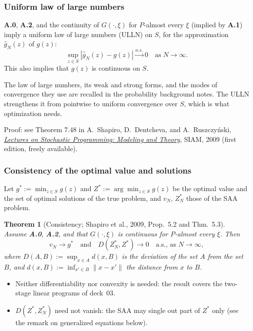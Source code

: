 \documentclass[aspectratio=169]{beamer}
\newtheorem{theo}{Theorem}
\begin{document}
\begin{frame}
\frametitle{Uniform law of large numbers}

\textbf{A.0}, \textbf{A.2}, and the continuity of $G(\cdot,\xi)$ for $P$-almost every $\xi$ (implied by \textbf{A.1}) imply a {\blue uniform law of large numbers (ULLN)} on $S$, for the approximation $\hat{g}_N(z)$ of $g(z)$:%
\[
\sup_{z \in S} \left| \hat{g}_N(z) - g(z) \right|
\overset{a.s.}{\longrightarrow} 0
\quad \mbox{as} \; N \rightarrow \infty.
\]
This also implies that $g(z)$ is continuous on $S$.

\mbox{}

\begin{footnotesize}
The law of large numbers, its weak and strong forms, and the modes of convergence they use are recalled in the {\red probability background notes}. The ULLN strengthens it from pointwise to uniform convergence over $S$, which is what optimization needs.
\end{footnotesize}

\mbox{}

Proof: see Theorem 7.48 in A.~Shapiro, D.~Dentcheva, and A.~Ruszczy\'nski, \href{https://bpb-us-e1.wpmucdn.com/sites.gatech.edu/dist/4/1470/files/2021/03/SPbook.pdf}{\sl Lectures on Stochastic Programming: Modeling and Theory}, SIAM, 2009 (first edition, freely available).

\end{frame}

\begin{frame}
\frametitle{Consistency of the optimal value and solutions}

Let $g^* := \min_{z \in S} g(z)$ and $Z^* := \arg\min_{z \in S} g(z)$ be the optimal value and the set of optimal solutions of the true problem, and $v_N$, $Z^*_N$ those of the SAA problem.

\begin{theo}[Consistency; Shapiro et al., 2009, Prop.~5.2 and Thm.~5.3]
Assume \textbf{A.0}, \textbf{A.2}, and that $G(\cdot,\xi)$ is continuous for $P$-almost every $\xi$. Then
\[
v_N \rightarrow g^* \quad \text{and} \quad D(Z^*_N, Z^*) \rightarrow 0 \quad \text{a.s., as } N \rightarrow \infty,
\]
where $D(A,B) := \sup_{x \in A} d(x, B)$ is the {\blue deviation} of the set $A$ from the set $B$, and $d(x,B) := \inf_{x' \in B} \| x - x' \|$ the distance from $x$ to $B$.
\end{theo}

\begin{itemize}
\item
Neither differentiability nor convexity is needed: the result covers the two-stage linear programs of deck~03.
\item
$D(Z^*, Z^*_N)$ need not vanish: the SAA may single out part of $Z^*$ only (see the remark on generalized equations below).
\end{itemize}

\end{frame}
\end{document}
